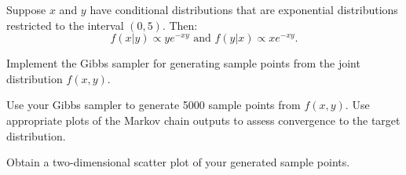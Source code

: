 \begin{exercise}
Suppose $x$ and $y$ have conditional distributions that are exponential distributions restricted to the interval $(0, 5)$. Then:
$$f(x|y)\propto ye^{-xy}\textrm{ and } f(y|x)\propto xe^{-xy}.$$

\begin{asparaenum}[(a)]
\item Implement the Gibbs sampler for generating sample points from the joint distribution $f(x,y)$.

\item	Use your Gibbs sampler to generate 5000 sample points from $f(x,y)$. Use appropriate plots of the Markov chain outputs to assess convergence to the target distribution.

\item	Obtain a two-dimensional scatter plot of your generated sample points.
\end{asparaenum}
\end{exercise}

